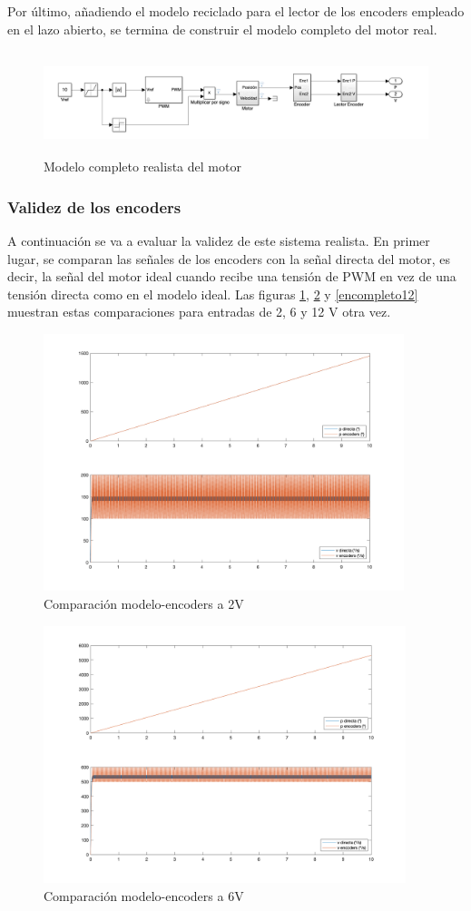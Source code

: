 \documentclass[a4paper, 12pt]{article}
\begin{document}
Por último, añadiendo el modelo reciclado para el lector de los encoders empleado en el lazo abierto, se termina de construir el modelo completo del motor real.  
\begin{figure}[h!]
	\centering
	\includegraphics[height = 3cm]{real_completo}
	\caption{Modelo completo realista del motor}
\end{figure}
\subsubsection{Validez de los encoders}
A continuación se va a evaluar la validez de este sistema realista.
En primer lugar, se comparan las señales de los encoders con la señal directa del motor, es decir, la señal del motor ideal cuando recibe una tensión de PWM en vez de una tensión directa como en el modelo ideal. Las figuras \ref{encompleto02}, \ref{encompleto06} y \ref{encompleto12} muestran estas comparaciones para entradas de 2, 6 y 12 V otra vez.  \\
\begin{figure}[h!] 
	\centering
	\includegraphics[height=7.5cm]{figs/p3/directaencoder2V} 
	\caption{Comparación modelo-encoders a 2V} \label{encompleto02}
\end{figure}
\begin{figure}[h!]
	\centering
	\includegraphics[height=7.5cm]{figs/p3/directaencoder6V} 
	\caption{Comparación modelo-encoders a 6V} \label{encompleto06}
\end{figure}
\end{document}
